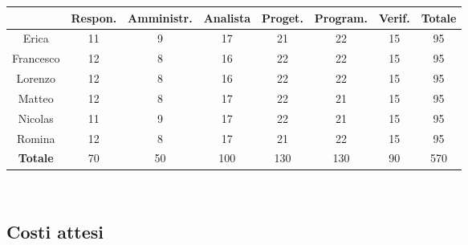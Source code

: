 \documentclass[a4paper, 12pt]{article}
\begin{document}
\begin{tabular}{|c|c|c|c|c|c|c|c|}
	\hline
	\textbf{}       & \textbf{Respon.} & \textbf{Amministr.} & \textbf{Analista} & \textbf{Proget.} & \textbf{Program.} & \textbf{Verif.} & \textbf{Totale} \\
	\hline
	Erica           & 11               & 9                   & 17                & 21               & 22                & 15              & 95              \\
	\hline
	Francesco       & 12               & 8                   & 16                & 22               & 22                & 15              & 95              \\
	\hline
	Lorenzo         & 12               & 8                   & 16                & 22               & 22                & 15              & 95              \\
	\hline
	Matteo          & 12               & 8                   & 17                & 22               & 21                & 15              & 95              \\
	\hline
	Nicolas         & 11               & 9                   & 17                & 22               & 21                & 15              & 95              \\
	\hline
	Romina          & 12               & 8                   & 17                & 21               & 22                & 15              & 95              \\
	\hline
	\textbf{Totale} & 70               & 50                  & 100               & 130              & 130               & 90              & 570             \\
	\hline
\end{tabular}\\[8pt]

\subsection{Costi attesi}
\end{document}
